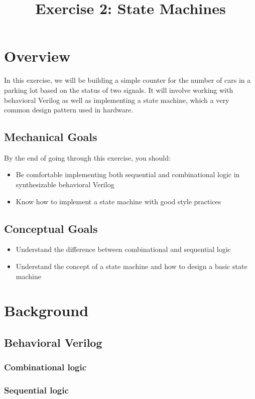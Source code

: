 \documentclass{article}
\begin{document}
\title{Exercise 2: State Machines}
\date{}
\maketitle

\section*{Overview}
In this exercise, we will be building a simple counter for the number of cars in
a parking lot based on the status of two signals. It will involve working with
behavioral Verilog as well as implementing a state machine, which a very common
design pattern used in hardware.

\subsection*{Mechanical Goals}
By the end of going through this exercise, you should:
\begin{itemize}
    \item Be comfortable implementing both sequential and combinational logic in
    synthesizable behavioral Verilog
    \item Know how to implement a state machine with good style practices
\end{itemize}

\subsection*{Conceptual Goals}
\begin{itemize}
    \item Understand the difference between combinational and sequential logic
    \item Understand the concept of a state machine and how to design a basic
    state machine 
\end{itemize}

\section*{Background}
\subsection*{Behavioral Verilog}
\subsubsection*{Combinational logic}
\subsubsection*{Sequential logic}
\end{document}
